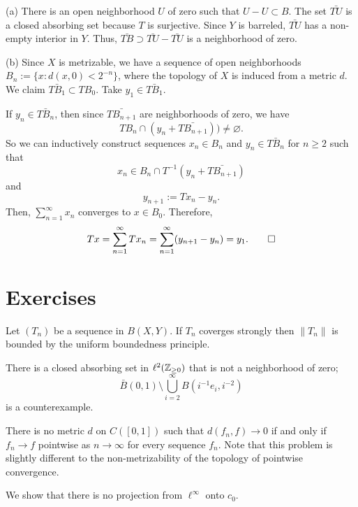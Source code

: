 \documentclass{../../large}
\begin{document}
\begin{pf}
(a)
There is an open neighborhood $U$ of zero such that $U-U\subset B$.
The set $\bar{TU}$ is a closed absorbing set because $T$ is surjective.
Since $Y$ is barreled, $\bar{TU}$ has a non-empty interior in $Y$.
Thus, $\bar{TB}\supset\bar{TU}-\bar{TU}$ is a neighborhood of zero.

(b)
Since $X$ is metrizable, we have a sequence of open neighborhoods $B_n:=\{x:d(x,0)<2^{-n}\}$, where the topology of $X$ is induced from a metric $d$.
We claim $\bar{TB_1}\subset TB_0$.
Take $y_1\in\bar{TB_1}$.

If $y_n\in\bar{TB_n}$, then since $\bar{TB_{n+1}}$ are neighborhoods of zero, we have
\[TB_n\cap(y_n+\bar{TB_{n+1}}))\ne\varnothing.\]
So we can inductively construct sequences $x_n\in B_n$ and $y_n\in\bar{TB_n}$ for $n\ge2$ such that
\[x_n\in B_n\cap T^{-1}(y_n+\bar{TB_{n+1}})\]
and
\[y_{n+1}:=Tx_n-y_n.\]
Then, $\sum_{n=1}^\infty x_n$ converges to $x\in B_0$.
Therefore,
\[Tx=\sum_{n=1}^\infty Tx_n=\sum_{n=1}^\infty(y_{n+1}-y_n)=y_1.\qedhere\]
\end{pf}


\section*{Exercises}

\begin{prb}
Let $(T_n)$ be a sequence in $B(X,Y)$.
If $T_n$ coverges strongly then $\|T_n\|$ is bounded by the uniform boundedness principle.
\end{prb}

\begin{prb}
There is a closed absorbing set in $\ell^2(\mathbb{Z}_{\ge0})$ that is not a neighborhood of zero;
\[\bar B(0,1)\setminus\bigcup_{i=2}^\infty B(i^{-1}e_i,i^{-2})\]
is a counterexample.
\end{prb}




\begin{prb}
There is no metric $d$ on $C([0,1])$ such that $d(f_n,f)\to0$ if and only if $f_n\to f$ pointwise as $n\to\infty$ for every sequence $f_n$.
Note that this problem is slightly different to the non-metrizability of the topology of pointwise convergence.
\end{prb}

\begin{prb}
We show that there is no projection from $\ell^\infty$ onto $c_0$.
\end{prb}
\end{document}
